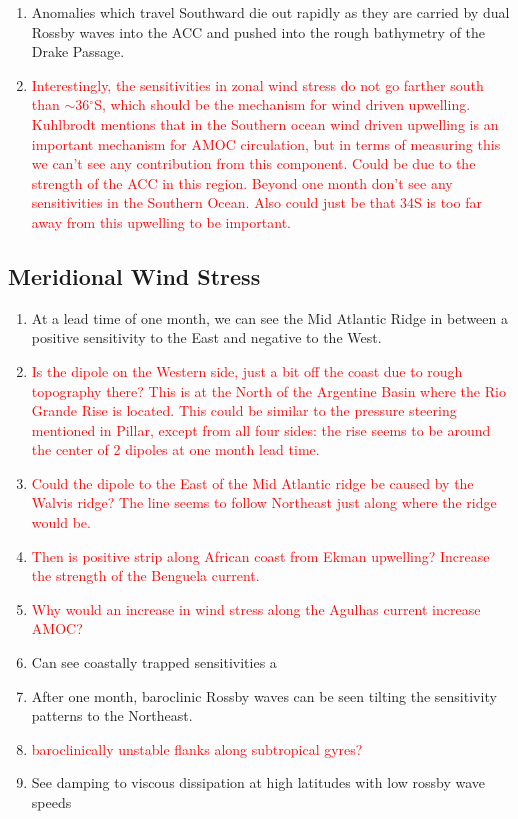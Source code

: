 \documentclass[a4paper,11pt]{article}
\newcommand{\red}[1]{\textcolor{red}{#1}}
\begin{document}
\begin{enumerate}
	\item Anomalies which travel Southward die out rapidly as they are carried by dual Rossby waves into the ACC and pushed into the rough bathymetry of the Drake Passage. 
	\item \red{Interestingly, the sensitivities in zonal wind stress do not go farther south than $\sim$36$^{\circ}$S, which should be the mechanism for wind driven upwelling. Kuhlbrodt mentions that in the Southern ocean wind driven upwelling is an important mechanism for AMOC circulation, but in terms of measuring this we can't see any contribution from this component. Could be due to the strength of the ACC in this region. Beyond one month don't see any sensitivities in the Southern Ocean. Also could just be that 34S is too far away from this upwelling to be important.}
    \end{enumerate}
   \subsection{Meridional Wind Stress}
    \begin{enumerate}
	\item At a lead time of one month, we can see the Mid Atlantic Ridge in between a positive sensitivity to the East and negative to the West. 
	\item \red{Is the dipole on the Western side, just a bit off the coast due to rough topography there? This is at the North of the Argentine Basin where the Rio Grande Rise is located. This could be similar to the pressure steering mentioned in Pillar, except from all four sides: the rise seems to be around the center of 2 dipoles at one month lead time. }
	\item \red{Could the dipole to the East of the Mid Atlantic ridge be caused by the Walvis ridge? The line seems to follow Northeast just along where the ridge would be.}
	\item \red{Then is positive strip along African coast from Ekman upwelling? Increase the strength of the Benguela current.}
	\item \red{Why would an increase in wind stress along the Agulhas current increase AMOC?}
	\item Can see coastally trapped sensitivities a
	\item After one month, baroclinic Rossby waves can be seen tilting the sensitivity patterns to the Northeast. 
	\item \red{baroclinically unstable flanks along subtropical gyres?}
	\item See damping to viscous dissipation at high latitudes with low rossby wave speeds
    \end{enumerate} 
\end{document}
